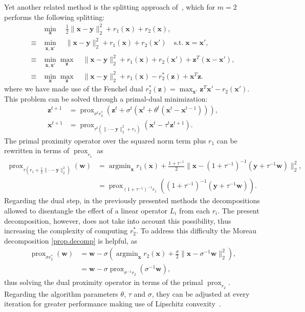 \documentclass[twoside,11pt]{article}
\newcommand{\vw}{\bm{w}}       \newcommand{\vwh}{\hat{\bm{w}}}        \newcommand{\wh}{\hat{w}}    \newcommand{\vwt}{\tilde{\bm{w}}}       \newcommand{\wt}{\tilde{w}}
\newcommand{\vx}{\bm{x}}       \newcommand{\vxh}{\hat{\bm{x}}}        \newcommand{\xh}{\hat{x}}    \newcommand{\vxt}{\tilde{\bm{x}}}       \newcommand{\xt}{\tilde{x}}
\newcommand{\vy}{\bm{y}}       \newcommand{\vyh}{\hat{\bm{y}}}        \newcommand{\yh}{\hat{y}}    \newcommand{\vyt}{\tilde{\bm{y}}}       \newcommand{\yt}{\tilde{y}}
\newcommand{\vz}{\bm{z}}       \newcommand{\vzh}{\hat{\bm{z}}}        \newcommand{\zh}{\hat{z}}    \newcommand{\vzt}{\tilde{\bm{z}}}       \newcommand{\zt}{\tilde{z}}
\newcommand{\mynorm}[2]{\| {#1} \|_{#2}}
\newcommand{\enorm}[1]{\mynorm{#1}{2}}
\DeclareMathOperator*{\argmin}{argmin}
\DeclareMathOperator{\prox}{prox}
\newcommand{\half}{\tfrac{1}{2}}
\numberwithin{equation}{section}
\numberwithin{theorem}{section}
\begin{document}
Yet another related method is the splitting approach of~\citet{Kolmogorov16}, which for $m=2$ performs the following splitting:
\begin{align*}
 & \min_{\vx} \quad \half \enorm{\vx -\vy}^2 + r_1(\vx) + r_2(\vx), \\
 \equiv & \min_{\vx, \vx'} \quad \enorm{\vx -\vy}^2 + r_1(\vx) + r_2(\vx') \quad \text{s.t.} \; \vx = \vx', \\
 \equiv & \min_{\vx, \vx'} \max_{\vz} \quad \enorm{\vx -\vy}^2 + r_1(\vx) + r_2(\vx') + \vz^T(\vx - \vx'), \\
 \equiv & \min_{\vx} \max_{\vz} \quad \enorm{\vx -\vy}^2 + r_1(\vx) - r^*_2(\vz) + \vx^T \vz.
\end{align*}
where we have made use of the Fenchel dual $r^*_2(\vz) = \max_{\vx'} \vz^T \vx' - r_2(\vx')$.
This problem can be solved through a primal-dual minimization:
\begin{align*}
 \vz^{t+1} &= \prox_{\sigma^t r^*_2} \left( \vz^t + \sigma^t (\vx^t + \theta^t (\vx^t - \vx^{t-1})) \right), \\
 \vx^{t+1} &= \prox_{\tau^t (\enorm{\cdot -\vy}^2 + r_1)} \left( \vx^t - \tau^t \vz^{t+1} \right).
\end{align*}
The primal proximity operator over the squared norm term plus $r_1$ can be rewritten in terms of $\prox_{r_1}$ as
\begin{align*}
\prox_{\tau (r_1 + \half \enorm{\cdot - \vy}^2)}(\vw) &= \argmin_{\vx} r_1(\vx) + \frac{1 + \tau^{-1}}{2} \enorm{\vx - (1+\tau^{-1})^{-1} (\vy + \tau^{-1} \vw)}^2, \\
  &= \prox_{(1+\tau^{-1})^{-1} r_1} \left( (1+\tau^{-1})^{-1} (\vy + \tau^{-1} \vw) \right).
\end{align*}
Regarding the dual step, in the previously presented methods the decompositions allowed to disentangle the effect of a linear operator $L_i$ from each $r_i$. The present decomposition, however, does not take into account this possibility, thus increasing the complexity of computing $r_2^*$. To address this difficulty the Moreau decomposition \eqref{prop.decomp} is helpful, as
\begin{align*}
 \prox_{\sigma r^*_2} \left( \vw \right) &= \vw - \sigma \left( \argmin_{\vx} r_2(\vx) + \frac{\sigma}{2} \enorm{\vx - \sigma^{-1} \vw}^2 \right), \\
  &= \vw - \sigma \prox_{\sigma^{-1} r_2}(\sigma^{-1} \vw),
\end{align*}
thus solving the dual proximity operator in terms of the primal $\prox_{r_2}$.
Regarding the algorithm parameters $\theta$, $\tau$ and $\sigma$, they can be adjusted at every iteration for greater performance making use of Lipschitz convexity~\citep{ChambolleErgodic14}.
\end{document}
